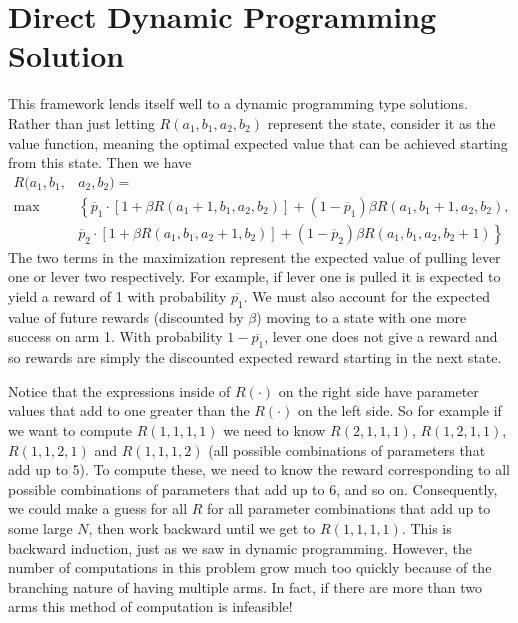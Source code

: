 \section*{Direct Dynamic Programming Solution}
This framework lends itself well to a dynamic programming type solutions.  
Rather than just letting $R(a_1,b_1,a_2,b_2)$ represent the state, consider 
it as the value function, meaning the optimal expected value that can be achieved 
starting from this state.  Then we have
\begin{equation}
\label{recurs}
\begin{aligned}
R(a_1,b_1,&a_2,b_2) =\\
 \max&\left\{\overline{p}_1\cdot[1 + \beta R(a_1+1,b_1,a_2,b_2)] + (1-\overline{p}_1)\beta R(a_1,b_1+1,a_2,b_2)\right. ,\\
&  \left.\overline{p}_2\cdot[1 + \beta R(a_1,b_1,a_2+1,b_2)] + (1-\overline{p}_2)\beta R(a_1,b_1,a_2,b_2+1)\right\}
\end{aligned}
\end{equation}
The two terms in the maximization represent the expected value of pulling lever 
one or lever two respectively.  For example, if lever one is pulled it is expected 
to yield a reward of 1 with probability $\overline{p_1}$.  
We must also account for the expected value of future rewards 
(discounted by $\beta$) moving to a state with one more success on arm 1.  
With probability $1-\overline{p_1}$, lever one does not give a reward and so 
rewards are simply the discounted expected reward starting in the next state.

Notice that the expressions inside of $R(\cdot)$ on the right side have parameter 
values that add to one greater than the $R(\cdot)$ on the left side.  
So for example if we want to compute $R(1,1,1,1)$ we need to know 
$R(2,1,1,1)$, $R(1,2,1,1)$, $R(1,1,2,1)$ and $R(1,1,1,2)$ 
(all possible combinations of parameters that add up to 5).  
To compute these, we need to know the reward corresponding to all possible 
combinations of parameters that add up to 6, and so on.  Consequently, we could 
make a guess for all $R$ for all parameter combinations that add up to some large $N$, 
then work backward until we get to $R(1,1,1,1)$.  This is backward induction, 
just as we saw in dynamic programming.  However, the number of computations in this 
problem grow much too quickly because of the branching nature of having multiple arms.  
In fact, if there are more than two arms this method of computation is infeasible!


